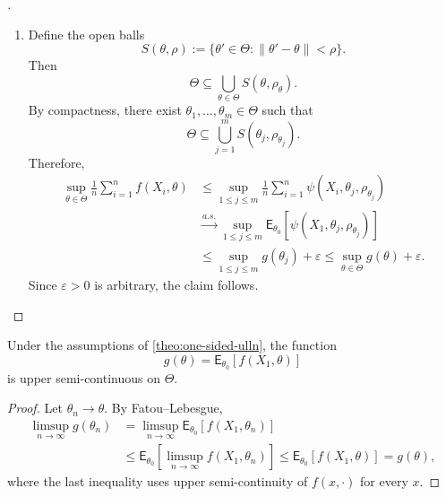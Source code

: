 \begin{proof}[]
\begin{enumerate}[label=\roman*.]
\item
Define the open balls
\begin{equation*}
S(\theta,\rho)
:=
\{\theta'\in\Theta:\|\theta'-\theta\|<\rho\}.
\end{equation*}
Then
\begin{equation*}
\Theta \subseteq \bigcup_{\theta\in\Theta} S(\theta,\rho_\theta).
\end{equation*}
By compactness, there exist $\theta_1,\dots,\theta_m\in\Theta$ such that
\begin{equation*}
\Theta \subseteq \bigcup_{j=1}^m S(\theta_j,\rho_{\theta_j}).
\end{equation*}
Therefore,
\begin{equation*}
\begin{aligned}
\sup_{\theta\in\Theta}\frac{1}{n}\sum_{i=1}^n f(X_i,\theta)
&\le
\sup_{1\le j\le m}
\frac{1}{n}\sum_{i=1}^n
\psi(X_i,\theta_j,\rho_{\theta_j}) \\
&\xrightarrow{a.s.}
\sup_{1\le j\le m}
\mathsf{E}_{\theta_0}[\psi(X_1,\theta_j,\rho_{\theta_j})] \\
&\le
\sup_{1\le j\le m} g(\theta_j) + \varepsilon
\le
\sup_{\theta\in\Theta} g(\theta) + \varepsilon.
\end{aligned}
\end{equation*}
Since $\varepsilon>0$ is arbitrary, the claim follows.
\end{enumerate}
\end{proof}


\begin{lemma}
\label{lem:usc}
Under the assumptions of \autoref{theo:one-sided-ulln}, the function
\begin{equation*}
g(\theta)
=
\mathsf{E}_{\theta_0}[f(X_1,\theta)]
\end{equation*}
is upper semi-continuous on $\Theta$.
\end{lemma}

\begin{proof}
Let $\theta_n\to\theta$. By Fatou--Lebesgue,
\begin{equation*}
\begin{aligned}
\limsup_{n\to\infty} g(\theta_n)
&=
\limsup_{n\to\infty} \mathsf{E}_{\theta_0}[f(X_1,\theta_n)] \\
&\le
\mathsf{E}_{\theta_0}\!\left[\limsup_{n\to\infty} f(X_1,\theta_n)\right]
\le
\mathsf{E}_{\theta_0}[f(X_1,\theta)]
=
g(\theta),
\end{aligned}
\end{equation*}
where the last inequality uses upper semi-continuity of $f(x,\cdot)$ for every $x$.
\end{proof}

